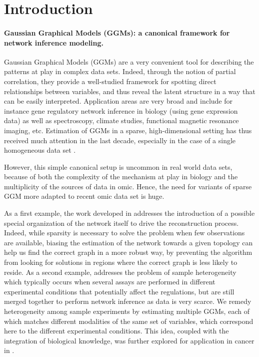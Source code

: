 \section{Introduction}

\paragraph*{Gaussian Graphical Models (GGMs): a canonical framework
  for network inference modeling.} Gaussian Graphical Models (GGMs)
\citep{1996_Book_Lauritzen,whittaker1990graphical} are a very
convenient tool for describing the patterns at play in complex data
sets.  Indeed, through the notion of partial correlation, they provide
a well-studied framework for spotting direct relationships between
variables, and thus reveal the latent structure in a way that can be
easily interpreted. Application areas are very broad and include for
instance gene regulatory network inference in biology (using gene
expression data) as well as spectroscopy, climate studies, functional
magnetic resonance imaging, etc.  Estimation of GGMs in a sparse,
high-dimensional setting has thus received much attention in the last
decade, especially in the case of a single homogeneous data set
\citep{2006_AS_Meinshausen,2007_BS_Friedman,2008_JMLR_Banerjee,2010_JMLR_Yuan,2011_AS_Cai}.

However, this simple canonical setup is uncommon in real world data
sets, because of both the complexity of the mechanism at play in
biology and the multiplicity of the sources of data in omic. Hence,
the need for variants of sparse GGM more adapted to recent omic data
set is huge.

As a first example, the work developed in \cite{2009_EJS_Chiquet,
  2009_BI_Chiquet} addresses the introduction of a possible special
organization of the network itself to drive the reconstruction
process.  Indeed, while sparsity is necessary to solve the problem
when few observations are available, biasing the estimation of the
network towards a given topology can help us find the correct graph in
a more robust way, by preventing the algorithm from looking for
solutions in regions where the correct graph is less likely to
reside. As a second example, \cite{2011_SC_Chiquet} addresses the
problem of sample heterogeneity which typically occurs when several
assays are performed in different experimental conditions that
potentially affect the regulations, but are still merged together to
perform network inference as data is very scarce.  We remedy
heterogeneity among sample experiments by estimating multiple GGMs,
each of which matches different modalities of the same set of
variables, which correspond here to the different experimental
conditions. This idea, coupled with the integration of biological
knowledge, was further explored for application in cancer in
\cite{2014_inbook_jeanmougin}.


